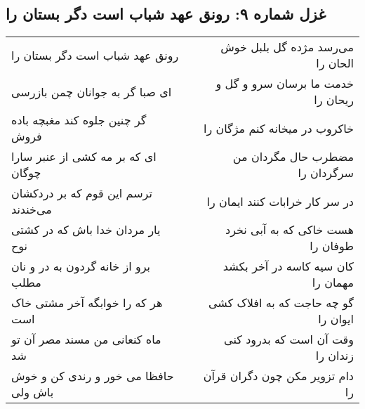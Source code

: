 \begin{center}
\section*{غزل شماره ۹: رونق عهد شباب است دگر بستان را}
\label{sec:sh009}
\begin{longtable}{l p{0.5cm} r}
رونق عهد شباب است دگر بستان را
&&
می‌رسد مژده گل بلبل خوش الحان را
\\
ای صبا گر به جوانان چمن بازرسی
&&
خدمت ما برسان سرو و گل و ریحان را
\\
گر چنین جلوه کند مغبچه باده فروش
&&
خاکروب در میخانه کنم مژگان را
\\
ای که بر مه کشی از عنبر سارا چوگان
&&
مضطرب حال مگردان من سرگردان را
\\
ترسم این قوم که بر دردکشان می‌خندند
&&
در سر کار خرابات کنند ایمان را
\\
یار مردان خدا باش که در کشتی نوح
&&
هست خاکی که به آبی نخرد طوفان را
\\
برو از خانه گردون به در و نان مطلب
&&
کان سیه کاسه در آخر بکشد مهمان را
\\
هر که را خوابگه آخر مشتی خاک است
&&
گو چه حاجت که به افلاک کشی ایوان را
\\
ماه کنعانی من مسند مصر آن تو شد
&&
وقت آن است که بدرود کنی زندان را
\\
حافظا می خور و رندی کن و خوش باش ولی
&&
دام تزویر مکن چون دگران قرآن را
\\
\end{longtable}
\end{center}
